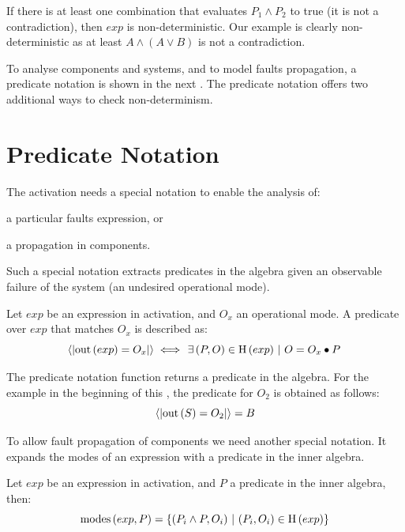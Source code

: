 If there is at least one combination that evaluates $P_1 \land P_2$ to true (it is not a contradiction), then $exp$ is non-deterministic.
Our example is clearly non-deterministic as at least $A \land \left(A \lor B\right)$ is not a contradiction.

To analyse components and systems, and to model faults propagation, a predicate notation is shown in the next .
The predicate notation offers two additional ways to check non-determinism.

\section{Predicate Notation}
\label{sec:predicates-notation}

The \acl{activation} needs a special notation to enable the analysis of: 
\begin{alineasinline}
  \item a particular faults expression, or 
  \item a propagation in components.
\end{alineasinline}
Such a special notation extracts predicates in the algebra given an observable failure of the system (an undesired operational mode).

\begin{definition}[Predicate]
\label{def:predicate}
Let $exp$ be an expression in \ac{activation}, and $O_x$ an operational mode.
A predicate over $exp$ that matches $O_x$ is described as:
\begin{equation}
\label{eq:predicate}
\predicate{exp}{O_x} \iff \left.\exists \left(P, O\right) \in \healthinessfun{exp}\ \middle|\ O = O_x \bullet P\right.
\end{equation}
\end{definition}


The predicate notation function returns a predicate in the algebra.
For the example in the beginning of this , the predicate for $O_2$ is obtained as follows:
\[
\left\langle\left| \mathrm{out}\left(S\right) = O_2 \right|\right\rangle = B
\]

To allow fault propagation of components we need another special notation. 
It expands the modes of an expression with a predicate in the inner algebra.

\begin{definition}[Modes]
Let $exp$ be an expression in \ac{activation}, and $P$ a predicate in the inner algebra, then:
\begin{equation}
\label{eq:modes}
\modes{exp}{P} = \left\{ \left(P_i \land P, O_i\right)\ \middle|\ (P_i, O_i) \in \healthinessfun{exp} \right\}
\end{equation}

\end{definition}

